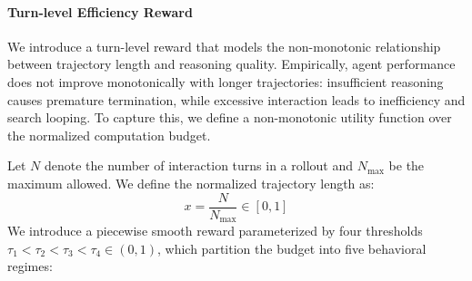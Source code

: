 \documentclass{huawei}
\begin{document}





\paragraph{Turn-level Efficiency Reward}
We introduce a turn-level reward that models the non-monotonic relationship between trajectory length and reasoning quality. Empirically, agent performance does not improve monotonically with longer trajectories: insufficient reasoning causes premature termination, while excessive interaction leads to inefficiency and search looping. To capture this, we define a non-monotonic utility function over the normalized computation budget. 

Let $N$ denote the number of interaction turns in a rollout and $N_{\max}$ be the maximum allowed. We define the normalized trajectory length as:
\begin{equation}
x = \frac{N}{N_{\max}} \in [0,1]
\end{equation}
We introduce a piecewise smooth reward parameterized by four thresholds $\tau_1 < \tau_2 < \tau_3 < \tau_4 \in (0, 1)$,  which partition the budget into five behavioral regimes:
\end{document}
